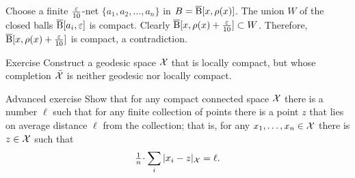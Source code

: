 Choose a finite $\tfrac{\varepsilon}{10}$-net $\{a_1,a_2,\dots,a_n\}$ in $B=\overline{\mathrm{B}}{}[x,\rho(x)]$.
The union $W$ of the closed balls $\overline{\mathrm{B}}{}[a_i,\varepsilon]$ is compact.
Clearly
$\overline{\mathrm{B}}{}[x,\rho(x)+\frac{\varepsilon}{10}]\subset W$.
Therefore, $\overline{\mathrm{B}}{}[x,\rho(x)+\frac{\varepsilon}{10}]$ is compact,
a contradiction.
\qeds

\begin{thm}{Exercise}\label{exercise from BH}
Construct a geodesic space $\mathcal{X}$ that is locally compact,
but whose completion $\bar{\mathcal{X}}$ is neither geodesic nor locally compact.
\end{thm}


\begin{thm}{Advanced exercise}\label{ex:gross}
Show that for any compact connected space $\mathcal{X}$ there is a number $\ell$ such that for any finite collection of points there is a point $z$ that lies on average distance $\ell$ from the collection;
that is, for any $x_1,\dots,x_n\in \mathcal{X}$ there is $z\in \mathcal{X}$ such that
\[\tfrac1n\cdot\sum_i|x_i-z|_{\spc{X}}=\ell.\]
\end{thm}






